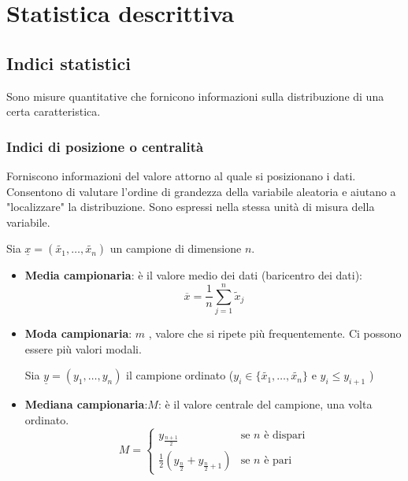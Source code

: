 \documentclass[a4paper]{article}
\theoremstyle{break}
\theoremstyle{break}
\theoremstyle{break}
\theoremstyle{break}
\begin{document}
\section{Statistica descrittiva}
\subsection{Indici statistici}
Sono misure quantitative che fornicono informazioni sulla distribuzione di una certa
caratteristica.
\subsubsection{Indici di posizione o centralità}
Forniscono informazioni del valore attorno al quale si posizionano i dati. Consentono
di valutare l'ordine di grandezza della variabile aleatoria e aiutano a "localizzare"
la distribuzione. Sono espressi nella stessa unità di misura della variabile.

\vspace{1em}
\noindent Sia \( \underline{x} = (\tilde{x_1}, \ldots, \tilde{x_n}) \) un campione di dimensione \( n \).
\begin{itemize}
	\item \textbf{Media campionaria}: è il valore medio dei dati (baricentro dei dati):
    \[
      \overline{x} = \frac{1}{n} \sum_{j=1}^{n} \tilde{x}_j
    \] 
	\item \textbf{Moda campionaria}: \( m \) , valore che si ripete più frequentemente. Ci possono
	      essere più valori modali.

        \vspace{1em}
        \noindent Sia \( \underline{y} = (y_1, \ldots, y_n) \) il campione
	      ordinato (\( y_i \in \{\tilde{x_1}, \ldots, \tilde{x_n}\}  \) e \( y_i \le y_{i+1} \) )
	\item \textbf{Mediana campionaria}:\( M \): è il valore centrale del campione, una 
    volta ordinato.
	      \[
		      M = \begin{cases}
			      y_{\frac{n+1}{2}}                             & \text{se } n \text{ è dispari} \\
			      \frac{1}{2}(y_{\frac{n}{2}} + y_{\frac{n}{2}+1}) & \text{se } n \text{ è pari}
		      \end{cases}
	      \]
\end{itemize}
\end{document}
